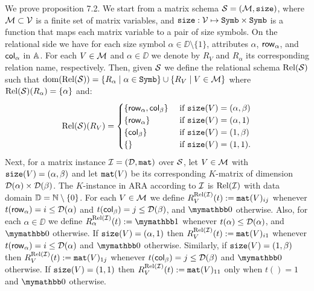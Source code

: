 We prove proposition 7.2.
We start from a matrix schema $\mathcal{S}=(\mathcal{M},\texttt{size})$, where $\mathcal{M}\subset \mathcal{V}$ is a finite set of matrix variables, 
and $\texttt{size}: \mathcal{V} \mapsto \texttt{Symb}\times \texttt{Symb}$ is a function that maps each matrix variable to a pair of size symbols. 
On the relational side we have for each size symbol $\alpha\in\DD\setminus\{1\}$, attributes $\alpha$, $\mathsf{row}_\alpha$, 
and $\mathsf{col}_\alpha$ in $\mathbb{A}$. For each $V\in\mathcal{M}$ and $\alpha \in \DD$ we denote
by $R_V$ and $R_\alpha$ its corresponding relation name, respectively. Then, given $\mathcal{S}$ we define the relational 
schema $\text{Rel}(\mathcal{S})$ such that $\operatorname{dom}(\text{Rel}(\mathcal{S})) =  \{R_\alpha \mid \alpha\in\texttt{Symb}\} \cup \{R_V \mid V \in \mathcal{M}\}$ 
where $\text{Rel}(\mathcal{S})(R_\alpha) = \{\alpha\}$ and:
\[
\text{Rel}(\mathcal{S})(R_V) = \begin{cases}
\lbrace\mathsf{row}_\alpha,\mathsf{col}_\beta \rbrace & \text{ if $ \texttt{size}(V)=(\alpha,\beta)$} \\
\lbrace\mathsf{row}_\alpha \rbrace & \text{ if $ \texttt{size}(V)=(\alpha,1)$} \\
\lbrace\mathsf{col}_\beta \rbrace  &
\text{ if $ \texttt{size}(V)=(1,\beta)$} \\
\lbrace\rbrace & \text{ if $\texttt{size}(V)=(1,1)$}.
\end{cases}
\]
Next, for a matrix instance $\mathcal{I} = (\mathcal{D},\texttt{mat})$ over $\mathcal{S}$,
let $V\in\mathcal{M}$ with $\texttt{size}(V)=(\alpha,\beta)$ and let $\texttt{mat}(V)$ be its corresponding $K$-matrix of dimension $\mathcal{D}(\alpha)\times \mathcal{D}(\beta)$.
The $K$-instance in ARA according to $\mathcal{I}$ is $\text{Rel}(\mathcal{I})$ with data domain $\mathbb{D} = \mathbb{N} \setminus \{0\}$. For each $V\in\mathcal{M}$ we define 
$R_V^{\text{Rel}(\mathcal{I})}(t):=\texttt{mat}(V)_{ij}$ whenever $t(\mathsf{row}_\alpha) = i \leq \mathcal{D}(\alpha)$ and $t(\mathsf{col}_\beta) = j \leq \mathcal{D}(\beta)$, and $\kzero$ otherwise. 
Also, for each $\alpha \in \DD$ we define $R_\alpha^{\text{Rel}(\I)}(t):=\kone$ whenever $t(\alpha) \leq \mathcal{D}(\alpha)$, and $\kzero$ otherwise.
If $\texttt{size}(V)=(\alpha,1)$ then $R_V^{\text{Rel}(\mathcal{I})}(t):=\texttt{mat}(V)_{i1}$ whenever $t(\mathsf{row}_\alpha) = i \leq \mathcal{D}(\alpha)$ and $\kzero$ otherwise.
Similarly, if $\texttt{size}(V)=(1,\beta)$ then $R_V^{\text{Rel}(\mathcal{I})}(t):=\texttt{mat}(V)_{1j}$ whenever $t(\mathsf{col}_\beta) = j \leq \mathcal{D}(\beta)$ and $\kzero$ otherwise.
If $\texttt{size}(V)=(1,1)$ then $R_V^{\text{Rel}(\mathcal{I})}(t):=\texttt{mat}(V)_{11}$ only when $t() = 1$ and $\kzero$ otherwise.

